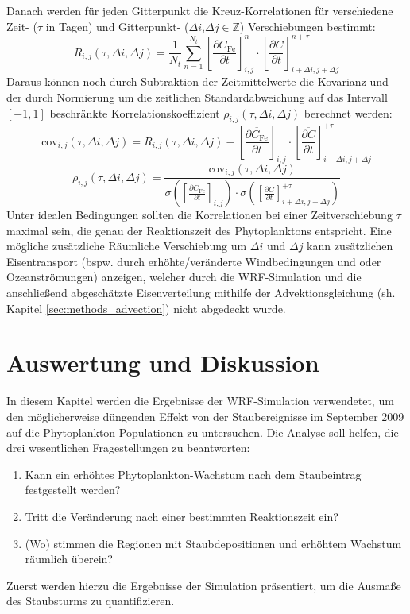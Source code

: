 \documentclass[12pt,a4paper,onecolumn,draft]{scrartcl}
\begin{document}
Danach werden für jeden Gitterpunkt die Kreuz-Korrelationen für verschiedene Zeit- ($\tau$ in Tagen) und Gitterpunkt- ($\Delta i$,$\Delta j \in \mathbb{Z}$) Verschiebungen bestimmt:
\begin{equation}
R_{i,j}(\tau,\Delta i, \Delta j)= \frac{1}{N_t}\sum\limits_{n=1}^{N_t} \left[\frac{\partial C_\text{Fe}}{\partial t}\right]_{i,j}^n \cdot \left[\frac{\partial C}{\partial t}\right]_{i+\Delta i ,j+\Delta j}^{n+\tau}
\end{equation}
Daraus können noch durch Subtraktion der Zeitmittelwerte die Kovarianz und der durch Normierung um die zeitlichen Standardabweichung auf das Intervall $[-1,1]$ beschränkte Korrelationskoeffizient $\rho_{i,j}(\tau,\Delta i, \Delta j)$ berechnet werden:
\begin{equation}
\text{cov}_{i,j}(\tau,\Delta i, \Delta j) = R_{i,j}(\tau,\Delta i, \Delta j)-\left[\frac{\overline{\partial C_\text{Fe}}}{\partial t}\right]_{i,j} \cdot \left[\frac{\overline{\partial C}}{\partial t}\right]_{i+\Delta i,j+\Delta j}^{+\tau}
\end{equation}
\begin{equation}
\rho_{i,j}(\tau,\Delta i, \Delta j) = \frac{\text{cov}_{i,j}(\tau,\Delta i, \Delta j)}{\sigma \left(\left[\frac{\partial C_\text{Fe}}{\partial t}\right]_{i,j}\right) \cdot \sigma\left(\left[\frac{\partial C}{\partial t}\right]_{i+\Delta i ,j+\Delta j}^{+\tau}\right)}
\end{equation}
Unter idealen Bedingungen sollten die Korrelationen bei einer Zeitverschiebung $\tau$ maximal sein, die genau der Reaktionszeit des Phytoplanktons entspricht. Eine mögliche zusätzliche Räumliche Verschiebung um $\Delta i$ und $\Delta j$ kann zusätzlichen Eisentransport (bspw. durch erhöhte/veränderte Windbedingungen und oder Ozeanströmungen) anzeigen, welcher durch die WRF-Simulation und die anschließend abgeschätzte Eisenverteilung mithilfe der Advektionsgleichung (sh. Kapitel \ref{sec:methods_advection}) nicht abgedeckt wurde.  

\section{Auswertung und Diskussion} \label{sec:auswertung}
In diesem Kapitel werden die Ergebnisse der WRF-Simulation verwendetet, um den möglicherweise düngenden Effekt von der Staubereignisse im September 2009 auf die Phytoplankton-Populationen zu untersuchen. Die Analyse soll helfen, die drei wesentlichen Fragestellungen zu beantworten:
\begin{enumerate}
\item Kann ein erhöhtes Phytoplankton-Wachstum nach dem Staubeintrag festgestellt werden?
\item Tritt die Veränderung nach einer bestimmten Reaktionszeit ein?
\item (Wo) stimmen die Regionen mit Staubdepositionen und erhöhtem Wachstum räumlich überein?
\end{enumerate}
Zuerst werden hierzu die Ergebnisse der Simulation präsentiert, um die Ausmaße des Staubsturms zu quantifizieren. 
\end{document}
